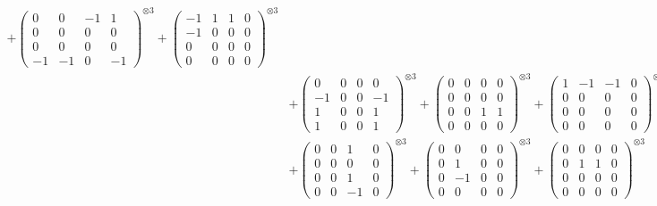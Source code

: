 \documentclass{article}
\begin{document}
{\begin{align}
            + \begin{pmatrix} 0 & 0 & -1 & 1 \\ 0 & 0 & 0 & 0 \\ 0 & 0 & 0 & 0 \\ -1 & -1 & 0 & -1 \end{pmatrix}^{\otimes 3} 
            + \begin{pmatrix} -1 & 1 & 1 & 0 \\ -1 & 0 & 0 & 0 \\ 0 & 0 & 0 & 0 \\ 0 & 0 & 0 & 0 \end{pmatrix}^{\otimes 3} \\
        &+ \label{Rs16-Rc11-Solution-21-c10} \begin{pmatrix} 0 & 0 & 0 & 0 \\ -1 & 0 & 0 & -1 \\ 1 & 0 & 0 & 1 \\ 1 & 0 & 0 & 1 \end{pmatrix}^{\otimes 3} 
            + \begin{pmatrix} 0 & 0 & 0 & 0 \\ 0 & 0 & 0 & 0 \\ 0 & 0 & 1 & 1 \\ 0 & 0 & 0 & 0 \end{pmatrix}^{\otimes 3} 
            + \begin{pmatrix} 1 & -1 & -1 & 0 \\ 0 & 0 & 0 & 0 \\ 0 & 0 & 0 & 0 \\ 0 & 0 & 0 & 0 \end{pmatrix}^{\otimes 3} \\
        &+ \label{Rs16-Rc11-Solution-21-c13} \begin{pmatrix} 0 & 0 & 1 & 0 \\ 0 & 0 & 0 & 0 \\ 0 & 0 & 1 & 0 \\ 0 & 0 & -1 & 0 \end{pmatrix}^{\otimes 3} 
            + \begin{pmatrix} 0 & 0 & 0 & 0 \\ 0 & 1 & 0 & 0 \\ 0 & -1 & 0 & 0 \\ 0 & 0 & 0 & 0 \end{pmatrix}^{\otimes 3} 
            + \begin{pmatrix} 0 & 0 & 0 & 0 \\ 0 & 1 & 1 & 0 \\ 0 & 0 & 0 & 0 \\ 0 & 0 & 0 & 0 \end{pmatrix}^{\otimes 3} \\

\end{align}}
\end{document}
